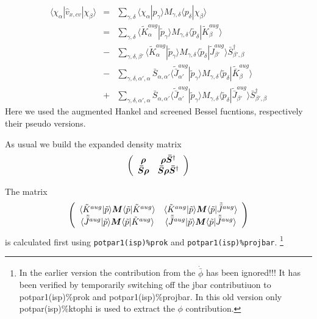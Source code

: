 \documentclass[11pt,a4paper]{report}
\begin{document}
\begin{eqnarray}
\langle\chi_\alpha|\hat{v}_{x,cv}|\chi_\beta\rangle
&=&
\sum_{\gamma,\delta}
\langle\chi_\alpha|p_\gamma\rangle 
M_{\gamma,\delta}\langle p_\delta|\chi_\beta\rangle
\nonumber\\
&=&
\sum_{\gamma,\delta}
\langle\tilde{K}^{aug}_\alpha|\tilde{p}_\gamma\rangle 
M_{\gamma,\delta}
\langle\tilde{p}_\delta|\tilde{K}^{aug}_\beta\rangle
\nonumber\\
&-&
\sum_{\gamma,\delta,\beta'}
\langle\tilde{K}^{aug}_\alpha|\tilde{p}_\gamma\rangle 
M_{\gamma,\delta}
\langle\tilde{p}_\delta|\tilde{J}^{aug}_{\beta'}\rangle \bar{S}^\dagger_{\beta',\beta}
\nonumber\\
&-&
\sum_{\gamma,\delta,\alpha',\alpha}
\bar{S}_{\alpha,\alpha'}\langle\tilde{\bar{J}}^{aug}_{\alpha'}|\tilde{p}_\gamma\rangle 
M_{\gamma,\delta}
\langle\tilde{p}_\delta|\tilde{\bar{K}}^{aug}_{\beta}\rangle 
\nonumber\\
&+&
\sum_{\gamma,\delta,\alpha',\alpha}
\bar{S}_{\alpha,\alpha'}\langle\tilde{\bar{J}}^{aug}_{\alpha'}|\tilde{p}_\gamma\rangle 
M_{\gamma,\delta}
\langle\tilde{p}_\delta|\tilde{\bar{J}}^{aug}_{\beta'}\rangle \bar{S}^\dagger_{\beta',\beta}
\end{eqnarray}
Here we used the augmented Hankel and screened Bessel fucntions,
respectively their pseudo versions.

As usual we build the expanded density matrix
\begin{eqnarray}
\left(\begin{array}{cc}
\bm{\rho} & \bm{\rho}\bm{\bar{S}}^\dagger\\
\bm{\bar{S}}\bm{\rho} & \bm{\bar{S}}\bm{\rho}\bm{\bar{S}}^\dagger\\
\end{array}\right)
\end{eqnarray}

The matrix 
\begin{eqnarray}
\left(\begin{array}{cc}
\langle\tilde{K}^{aug}|\tilde{p}\rangle 
\bm{M}\langle\tilde{p}|\tilde{K}^{aug}\rangle &
\langle\tilde{K}^{aug}|\tilde{p}\rangle 
\bm{M}\langle\tilde{p}|\tilde{\bar{J}}^{aug}\rangle \\
\langle\tilde{\bar{J}}^{aug}|\tilde{p}\rangle 
\bm{M}\langle\tilde{p}|\tilde{K}^{aug}\rangle &
\langle\tilde{\bar{J}}^{aug}|\tilde{p}\rangle 
\bm{M}\langle\tilde{p}|\tilde{\bar{J}}^{aug}\rangle \\
\end{array}\right)
\end{eqnarray}
is calculated first using \verb|potpar1(isp)%prok| and
\verb|potpar1(isp)%projbar|.
\footnote{ In the earlier version the contribution from the
  $\dot{\bar{\phi}}$ has been ignored!!! It has been verified by
  temporarily switching off the jbar contributiuon to
  potpar1(isp)\%prok and potpar1(isp)\%projbar. In this old version
  only potpar(isp)\%ktophi is used to extract the $\phi$
  contribution.}
\end{document}
